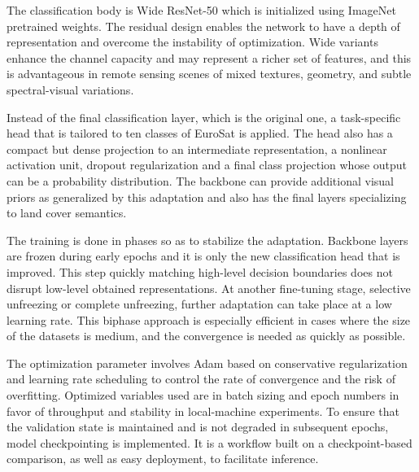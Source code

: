 ﻿\documentclass[conference]{IEEEtran}
\begin{document}
The classification body is Wide ResNet-50 which is initialized using ImageNet pretrained weights. The residual design enables the network to have a depth of representation and overcome the instability of optimization. Wide variants enhance the channel capacity and may represent a richer set of features, and this is advantageous in remote sensing scenes of mixed textures, geometry, and subtle spectral-visual variations.

Instead of the final classification layer, which is the original one, a task-specific head that is tailored to ten classes of EuroSat is applied. The head also has a compact but dense projection to an intermediate representation, a nonlinear activation unit, dropout regularization and a final class projection whose output can be a probability distribution. The backbone can provide additional visual priors as generalized by this adaptation and also has the final layers specializing to land cover semantics.

The training is done in phases so as to stabilize the adaptation. Backbone layers are frozen during early epochs and it is only the new classification head that is improved. This step quickly matching high-level decision boundaries does not disrupt low-level obtained representations. At another fine-tuning stage, selective unfreezing or complete unfreezing, further adaptation can take place at a low learning rate. This biphase approach is especially efficient in cases where the size of the datasets is medium, and the convergence is needed as quickly as possible.

The optimization parameter involves Adam based on conservative regularization and learning rate scheduling to control the rate of convergence and the risk of overfitting. Optimized variables used are in batch sizing and epoch numbers in favor of throughput and stability in local-machine experiments. To ensure that the validation state is maintained and is not degraded in subsequent epochs, model checkpointing is implemented. It is a workflow built on a checkpoint-based comparison, as well as easy deployment, to facilitate inference.
\end{document}
